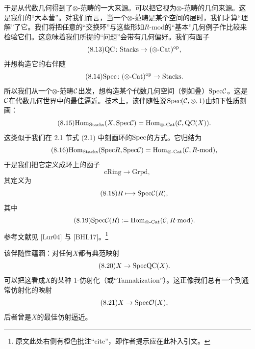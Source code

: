 于是从代数几何得到了$\otimes$-范畴的一大来源。可以把它视为$\otimes$-范畴的几何来源。这是我们的“大本营”。对我们而言，当一个$\otimes$-范畴是某个空间的层时，我们才算“理解”了它。我们将把任意的“交换环”与这些形如$R$-mod的“基本”几何例子作比较来检验它们。这意味着我们所提的“问题”会带有几何偏好。我们有函子
\begin{equation}\tag{8.13}
\mathrm{QC}\colon\mathrm{Stacks}\to(\otimes\text{-}\mathrm{Cat})^{\mathrm{op}},
\end{equation}
并想构造它的右伴随
\begin{equation}\tag{8.14}
\mathrm{Spec}\colon(\otimes\text{-}\mathrm{Cat})^{\mathrm{op}}\to\mathrm{Stacks}.
\end{equation}
所以我们从一个$\otimes$-范畴$\mathcal{C}$出发，想构造某个代数几何空间（例如叠）$\mathrm{Spec}\mathcal{C}$。这是$\mathcal{C}$在代数几何世界中的最佳逼近。技术上，该伴随性说$\mathrm{Spec}(\mathcal{C},\otimes,1)$由如下性质刻画：
\begin{equation}\tag{8.15}
\mathrm{Hom}_{\mathrm{Stacks}}(X,\mathrm{Spec}\mathcal{C})=\mathrm{Hom}_{\otimes\text{-}\mathrm{Cat}}(\mathcal{C},\mathrm{QC}(X)).
\end{equation}
这类似于我们在 2.1 节式 (2.1) 中刻画环的$\mathrm{Spec}$的方式。它归结为
\begin{equation}\tag{8.16}
\mathrm{Hom}_{\mathrm{Stacks}}(\mathrm{Spec} R,\mathrm{Spec}\mathcal{C})=\mathrm{Hom}_{\otimes\text{-}\mathrm{Cat}}(\mathcal{C},R\text{-mod}),
\end{equation}
于是我们把它定义成环上的函子
\begin{equation}\tag{8.17}
\mathrm{cRing}\to\mathrm{Grpd},
\end{equation}
其定义为
\begin{equation}\tag{8.18}
R\longmapsto \mathrm{Spec}\mathcal{C}(R),
\end{equation}
其中
\begin{equation}\tag{8.19}
\mathrm{Spec}\mathcal{C}(R):=\mathrm{Hom}_{\otimes\text{-}\mathrm{Cat}}(\mathcal{C},R\text{-mod}).
\end{equation}
参考文献见 [Lur04] 与 [BHL17]。\footnote{原文此处右侧有橙色批注“cite”，即作者提示应在此补入引文。}

该伴随性蕴涵：对任何$X$都有典范映射
\begin{equation}\tag{8.20}
X\to\mathrm{Spec}\mathrm{QC}(X).
\end{equation}
可以把这看成$X$的某种 1-仿射化（或“Tannakization”）。这正像我们总有一个到通常仿射化的映射
\begin{equation}\tag{8.21}
X\to\mathrm{Spec}\mathcal{O}(X),
\end{equation}
后者曾是$X$的最佳仿射逼近。

